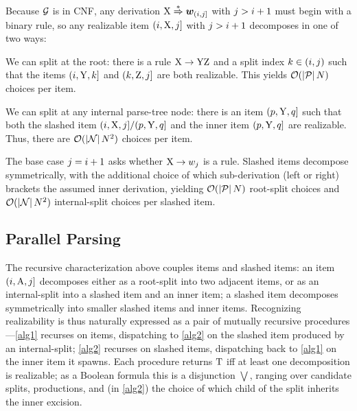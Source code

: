 \documentclass{article}
\begin{document}
Because ${{ \mathcal{G}}}$ is in CNF, any derivation ${{ \mathrm{X}}} \mathrel{{\overset{*}{\Rightarrow}}} {{\boldsymbol{w}}}_{({{ i}}, {{ j}}]}$ with ${{ j}} > {{ i}} + 1$ must begin with a binary rule, so any realizable item $({{ i}}, {{ \mathrm{X}}}, {{ j}}]$ with ${{ j}} > {{ i}} + 1$ decomposes in one of two ways: 
\begin{enumerate*}[label=\textit{(\alph*)}]
    \item We can split at the root: there is a rule ${{ {{ \mathrm{X}}} \rightarrow {{ \mathrm{Y}}}{{ \mathrm{Z}}}}}$ and a split index ${{ k}} \in ({{ i}}, {{ j}})$ such that the items $({{ i}}, {{ \mathrm{Y}}}, {{ k}}]$ and $({{ k}}, {{ \mathrm{Z}}}, {{ j}}]$ are both realizable.
    This yields ${{ \mathcal{O}}}(|{{ \mathcal{P}}}|\,{{ N}})$ choices per item. 
    \item We can split at any internal parse-tree node: there is an item $(p, {{ \mathrm{Y}}}, q]$ such that both the slashed item $({{ i}}, {{ \mathrm{X}}}, {{ j}}]/(p, {{ \mathrm{Y}}}, q]$ and the inner item $(p, {{ \mathrm{Y}}}, q]$ are realizable. Thus, there are ${{ \mathcal{O}}}(|{{ \mathcal{N}}}|\,{{ N}}^2)$ choices per item. 
\end{enumerate*}
The base case ${{ j}} = {{ i}} + 1$ asks whether ${{ {{ \mathrm{X}}} \rightarrow {w}_{{ j}}}}$ is a rule. Slashed items decompose symmetrically, with the additional choice of which sub-derivation (left or right) brackets the assumed inner derivation, yielding ${{ \mathcal{O}}}(|{{ \mathcal{P}}}|\,{{ N}})$ root-split choices and ${{ \mathcal{O}}}(|{{ \mathcal{N}}}|\,{{ N}}^2)$ internal-split choices per slashed item.

\subsection{Parallel Parsing}\label{subsec:generalcflalgo}
The recursive characterization above couples items and slashed items: an item $({{ i}}, {{ \mathrm{A}}}, {{ j}}]$ decomposes either as a root-split into two adjacent items, or as an internal-split into a slashed item and an inner item; a slashed item decomposes symmetrically into smaller slashed items and inner items. 
Recognizing realizability is thus naturally expressed as a pair of mutually recursive procedures---\cref{alg1} recurses on items, dispatching to \cref{alg2} on the slashed item produced by an internal-split; \cref{alg2} recurses on slashed items, dispatching back to \cref{alg1} on the inner item it spawns. 
Each procedure returns ${\mathbin{\mathrm{T}}}$ iff at least one decomposition is realizable; as a Boolean formula this is a disjunction $\bigvee$, ranging over candidate splits, productions, and (in \cref{alg2})
the choice of which child of the split inherits the inner excision.
\end{document}
